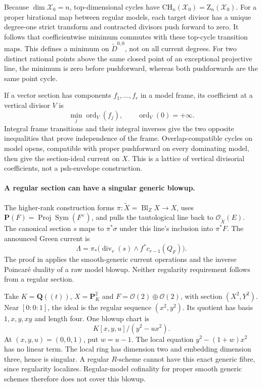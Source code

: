 Because \(\dim\mathcal X_0=n\), top-dimensional cycles have
\(\mathrm{CH}_n(\mathcal X_0)=\mathrm Z_n(\mathcal X_0)\).
For a proper birational map between regular models, each target
divisor has a unique degree-one strict transform and contracted
divisors push forward to zero. It follows that coefficientwise
minimum commutes with these top-cycle transition maps. This defines
a minimum on \(\widetilde D^{0,0}\), not on all current degrees.
For two distinct rational points above the same closed point of an
exceptional projective line, the minimum is zero before pushforward,
whereas both pushforwards are the same point cycle.

If a vector section has components \(f_1,\ldots,f_r\) in a model
frame, its coefficient at a vertical divisor \(V\) is
\[
 \min_j\operatorname{ord}_V(f_j),
 \qquad \operatorname{ord}_V(0)=+\infty.
\]
Integral frame transitions and their integral inverses give the two
opposite inequalities that prove independence of the frame.
Overlap-compatible cycles on model opens, compatible with proper
pushforward on every dominating model, then give the section-ideal
current on \(X\). This is a lattice of vertical divisorial
coefficients, not a psh-envelope construction.

\paragraph{A regular section can have a singular generic blowup.}
The higher-rank construction forms
\(\pi:\widetilde X=\operatorname{Bl}_Z X\to X\), uses
\(\mathbf P(F)=\operatorname{Proj}\operatorname{Sym}(F^\vee)\),
and pulls the tautological line back to \(\mathcal O_{\widetilde X}(E)\).
The canonical section \(s\) maps to \(\pi^*\sigma\) under this line's
inclusion into \(\pi^*F\). The announced Green current is
\[
 \Lambda=\pi_*\bigl(\operatorname{div}_v(s)
          \wedge f^*c_{r-1}(Q_F)\bigr).
\]
The proof in \cite[\S4]{Dubocs26GreenV1} applies the smooth-generic
current operations and the inverse Poincar\'e duality of a raw model
blowup. Neither regularity requirement follows from a regular section.

Take \(K=\mathbf Q((t))\), \(X=\mathbf P^2_K\) and
\(F=\mathcal O(2)\oplus\mathcal O(2)\), with section \((X^2,Y^2)\).
Near \([0:0:1]\), the ideal is the regular sequence \((x^2,y^2)\).
Its quotient has basis \(1,x,y,xy\) and length four.
One blowup chart is
\[
 K[x,y,u]/(y^2-ux^2).
\]
At \((x,y,u)=(0,0,1)\), put \(w=u-1\). The local equation
\(y^2-(1+w)x^2\) has no linear term. The local ring has dimension
two and embedding dimension three, hence is singular.
A regular \(R\)-scheme cannot have this exact generic fibre,
since regularity localizes. Regular-model cofinality for proper
smooth generic schemes therefore does not cover this blowup.

